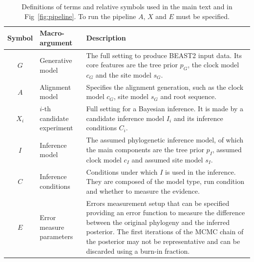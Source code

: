 \begin{table}
  \begin{tabular}{|@{}c|p{4cm}|p{12.2cm}|}
    \hline
    \centering
    \textbf{Symbol} &
    \textbf{Macro-argument} &
    \textbf{Description} \\
    \hline
    $\mathit{G}$ &
    Generative model &
    The full setting to produce BEAST2 input data. 
    Its core features are the tree prior $\mathit{p_{G}}$, the clock 
    model $\mathit{c_{G}}$ and the site model $\mathit{s_{G}}$. \\
    $\mathit{A}$ &
    Alignment model &
    Specifies the alignment generation, such as the clock model 
    $\mathit{c_{G}}$, site model $\mathit{s_{G}}$ and root sequence. \\
    $\mathit{X_{i}}$ &
    $i$-th candidate experiment &
    Full setting for a Bayesian inference. It is made by a 
    candidate inference model $\mathit{I_{i}}$ and its 
    inference conditions $\mathit{C_{i}}$. \\
    $\mathit{I}$ &
    Inference model &
    The assumed phylogenetic inference model, of which the main components
    are the tree prior $\mathit{p_{I}}$, assumed clock model $\mathit{c_{I}}$ 
    and assumed site model $\mathit{s_{I}}$. \\
    $\mathit{C}$ & Inference conditions & Conditions under which $\mathit{I}$ 
    is used in the inference. 
    They are composed of the model type, run condition and 
    whether to measure the evidence. \\
    $\mathit{E}$ & Error measure parameters & 
    Errors measurement setup that can be specified providing an 
    error function to measure the difference between the original phylogeny 
    and the inferred posterior. The first iterations of the MCMC chain of the 
    posterior may not be representative and can be discarded using a burn-in 
    fraction. \\
    \hline 
  \end{tabular}
  \caption{
    Definitions of terms and relative symbols used in the main text and in 
    Fig~\ref{fig:pipeline}. To run the pipeline $\mathit{A}$, $\mathit{X}$ 
    and $\mathit{E}$ must be specified.
  }
  \label{tab:definitions}
\end{table}

